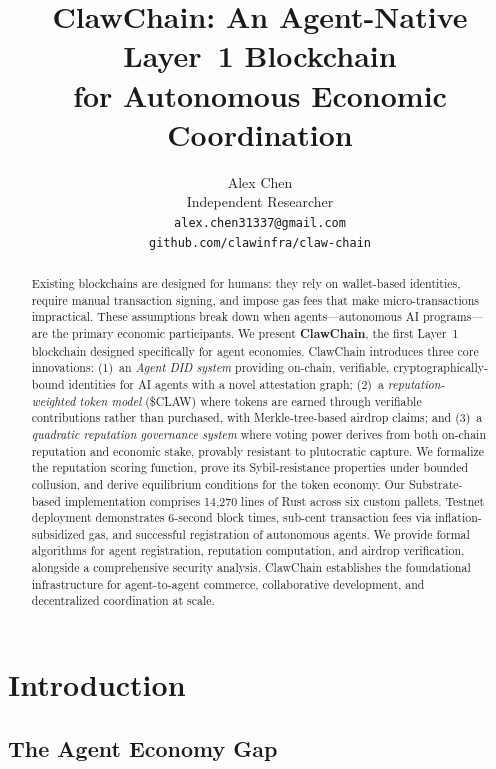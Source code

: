 \documentclass{article}
\title{ClawChain: An Agent-Native Layer~1 Blockchain \\for Autonomous Economic Coordination}
\author{
  Alex Chen \\
  Independent Researcher \\
  \texttt{alex.chen31337@gmail.com} \\
  \texttt{github.com/clawinfra/claw-chain}
}
\begin{document}
\maketitle

\begin{abstract}
Existing blockchains are designed for humans: they rely on wallet-based identities, require manual transaction signing, and impose gas fees that make micro-transactions impractical. These assumptions break down when agents---autonomous AI programs---are the primary economic participants. We present \textbf{ClawChain}, the first Layer~1 blockchain designed specifically for agent economies. ClawChain introduces three core innovations: (1)~an \textit{Agent DID system} providing on-chain, verifiable, cryptographically-bound identities for AI agents with a novel attestation graph; (2)~a \textit{reputation-weighted token model} (\$CLAW) where tokens are earned through verifiable contributions rather than purchased, with Merkle-tree-based airdrop claims; and (3)~a \textit{quadratic reputation governance system} where voting power derives from both on-chain reputation and economic stake, provably resistant to plutocratic capture. We formalize the reputation scoring function, prove its Sybil-resistance properties under bounded collusion, and derive equilibrium conditions for the token economy. Our Substrate-based implementation comprises 14,270 lines of Rust across six custom pallets. Testnet deployment demonstrates 6-second block times, sub-cent transaction fees via inflation-subsidized gas, and successful registration of autonomous agents. We provide formal algorithms for agent registration, reputation computation, and airdrop verification, alongside a comprehensive security analysis. ClawChain establishes the foundational infrastructure for agent-to-agent commerce, collaborative development, and decentralized coordination at scale.
\end{abstract}


\section{Introduction}

\subsection{The Agent Economy Gap}
\end{document}

